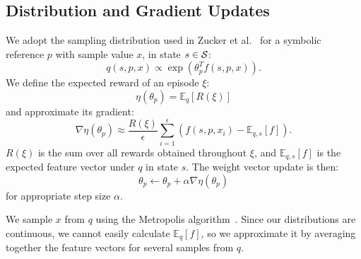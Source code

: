 \subsection{Distribution and Gradient Updates}
We adopt the sampling distribution used in Zucker et al.~\cite{workspacebias}
for a symbolic reference $p$ with sample value $x$, in state $s \in \mathcal{S}$:
$$q(s, p, x) \propto \exp(\theta_{p}^{T} f(s, p, x)).$$
We define the expected reward of an episode $\xi$:
$$\eta(\theta_{p}) = \mathbb{E}_{q}[R(\xi)]$$ and approximate its gradient:
$$\nabla \eta(\theta_{p}) \approx \frac{R(\xi)}{\epsilon} \sum_{i=1}^{\epsilon}(f(s, p, x_{i}) - \mathbb{E}_{q,s}[f]).$$
$R(\xi)$ is the sum over all rewards obtained throughout $\xi$, and
$\mathbb{E}_{q,s}[f]$ is the expected feature vector under $q$ in state $s$. The weight vector update is then:
$$\theta_{p} \leftarrow \theta_{p} + \alpha \nabla \eta(\theta_{p})$$
for appropriate step size $\alpha$.

We sample $x$ from $q$ using the Metropolis algorithm~\cite{chib1995understanding}.
Since our distributions are continuous, we cannot easily calculate $\mathbb{E}_{q}[f]$,
so we approximate it by averaging together the feature vectors for several samples from $q$.